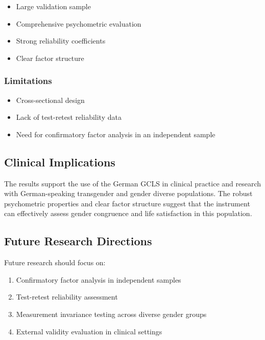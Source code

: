 \documentclass[
  english,
  man]{apa6}
\providecommand{\tightlist}{%
  \setlength{\itemsep}{0pt}\setlength{\parskip}{0pt}}
\begin{document}
\begin{itemize}
\tightlist
\item
  Large validation sample
\item
  Comprehensive psychometric evaluation
\item
  Strong reliability coefficients
\item
  Clear factor structure
\end{itemize}

\subsubsection{Limitations}\label{limitations}

\begin{itemize}
\tightlist
\item
  Cross-sectional design
\item
  Lack of test-retest reliability data
\item
  Need for confirmatory factor analysis in an independent sample
\end{itemize}

\subsection{Clinical Implications}\label{clinical-implications}

The results support the use of the German GCLS in clinical practice and research with German-speaking transgender and gender diverse populations. The robust psychometric properties and clear factor structure suggest that the instrument can effectively assess gender congruence and life satisfaction in this population.

\subsection{Future Research Directions}\label{future-research-directions}

Future research should focus on:

\begin{enumerate}
\def\labelenumi{\arabic{enumi}.}
\tightlist
\item
  Confirmatory factor analysis in independent samples
\item
  Test-retest reliability assessment
\item
  Measurement invariance testing across diverse gender groups
\item
  External validity evaluation in clinical settings
\end{enumerate}
\end{document}
